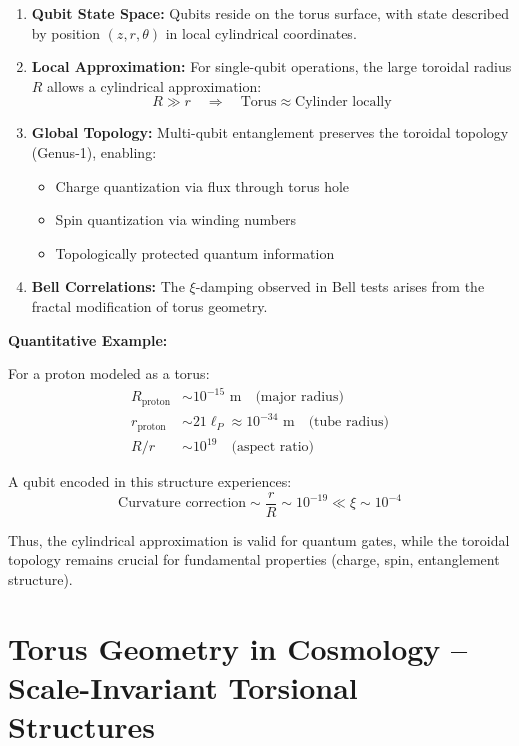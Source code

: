 \begin{enumerate}
	\item \textbf{Qubit State Space:} Qubits reside on the torus surface, 
	with state described by position $(z, r, \theta)$ in local 
	cylindrical coordinates.
	
	\item \textbf{Local Approximation:} For single-qubit operations, the 
	large toroidal radius $R$ allows a cylindrical approximation:
	\[
	R \gg r \quad \Rightarrow \quad 
	\text{Torus} \approx \text{Cylinder locally}
	\]
	
	\item \textbf{Global Topology:} Multi-qubit entanglement preserves the 
	toroidal topology (Genus-1), enabling:
	\begin{itemize}
		\item Charge quantization via flux through torus hole
		\item Spin quantization via winding numbers
		\item Topologically protected quantum information
	\end{itemize}
	
	\item \textbf{Bell Correlations:} The $\xi$-damping observed in Bell 
	tests arises from the fractal modification of torus geometry.
\end{enumerate}

\textbf{Quantitative Example:}

For a proton modeled as a torus:
\begin{align}
	R_{\text{proton}} &\sim 10^{-15} \text{ m} \quad \text{(major radius)} \\
	r_{\text{proton}} &\sim 21\ell_P \approx 10^{-34} \text{ m} \quad 
	\text{(tube radius)} \\
	R/r &\sim 10^{19} \quad \text{(aspect ratio)}
\end{align}

A qubit encoded in this structure experiences:
\[
\text{Curvature correction} \sim \frac{r}{R} \sim 10^{-19} 
\ll \xi \sim 10^{-4}
\]

Thus, the cylindrical approximation is valid for quantum gates, while 
the toroidal topology remains crucial for fundamental properties 
(charge, spin, entanglement structure).

\section{Torus Geometry in Cosmology – Scale-Invariant Torsional Structures}


